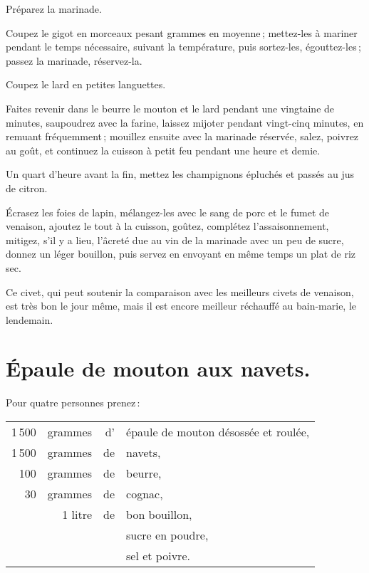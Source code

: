 Préparez la marinade.

Coupez le gigot en morceaux pesant {\mmm} grammes en moyenne ; mettez-les
à mariner pendant le temps nécessaire, suivant la température, puis sortez-les,
égouttez-les ; passez la marinade, réservez-la.

Coupez le lard en petites languettes.

Faites revenir dans le beurre le mouton et le lard pendant une vingtaine de
minutes, saupoudrez avec la farine, laissez mijoter pendant vingt-cinq minutes,
en remuant fréquemment ; mouillez ensuite avec la marinade réservée, salez,
poivrez au goût, et continuez la cuisson à petit feu pendant une heure et
demie.

Un quart d'heure avant la fin, mettez les champignons épluchés et passés au
jus de citron.

Écrasez les foies de lapin, mélangez-les avec le sang de porc et le fumet de
venaison, ajoutez le tout à la cuisson, goûtez, complétez l'assaisonnement,
mitigez, s'il y a lieu, l’âcreté due au vin de la marinade avec un peu de
sucre, donnez un léger bouillon, puis servez en envoyant en même temps un plat
de riz sec.

Ce civet, qui peut soutenir la comparaison avec les meilleurs civets de
venaison, est très bon le jour même, mais il est encore meilleur réchauffé au
bain-marie, le lendemain.

\section*{\centering Épaule de mouton aux navets.}
{}

Pour quatre personnes prenez :

\medskip

\footnotesize
\begin{longtable}{rrrp{16em}}
  1 500 & grammes & d' & épaule de mouton désossée et roulée,                                             \\
  1 500 & grammes & de & navets,                                                                          \\
    100 & grammes & de & beurre,                                                                          \\
     30 & grammes & de & cognac,                                                                          \\
        & 1 litre & de & bon bouillon,                                                                    \\
        &         &    & sucre en poudre,                                                                 \\
        &         &    & sel et poivre.                                                                   \\
\end{longtable}
\normalsize

